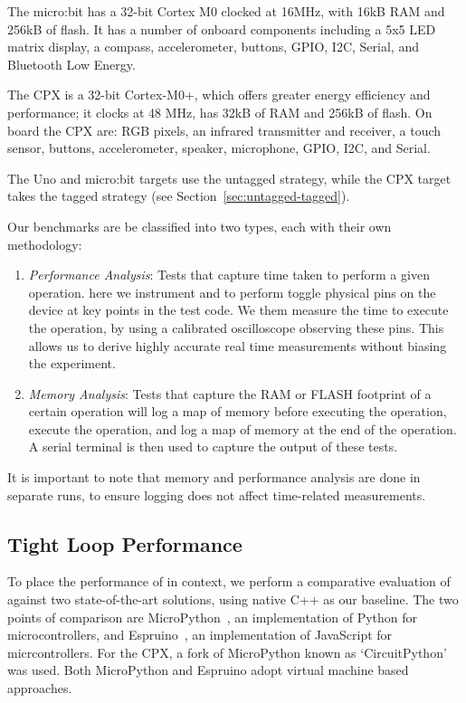 The micro:bit has a 32-bit Cortex M0 clocked at 16MHz, with 16kB RAM and 256kB of flash. It has a number of onboard components
including a 5x5 LED matrix display, a compass, accelerometer, buttons, GPIO, I2C, Serial, and Bluetooth Low Energy.

The CPX is a 32-bit Cortex-M0+, which offers greater energy efficiency and performance; it clocks at 48 MHz, has 32kB of RAM and
256kB of flash. On board the CPX are: RGB pixels, an infrared transmitter and receiver, a touch sensor, buttons, accelerometer, speaker,
microphone, GPIO, I2C, and Serial.

The Uno and micro:bit \MC targets use the untagged strategy, while the CPX target takes the tagged strategy (see Section~\ref{sec:untagged-tagged}).

Our benchmarks are be classified into two types, each with their own methodology:

\begin{enumerate}
    \item \textit{Performance Analysis}: Tests that capture time taken to perform a given operation. here we instrument
    \MC and \CO to perform toggle physical pins on the device at key points in the test code. We them measure the time to
   execute the operation, by using a calibrated oscilloscope observing these pins. This allows us to derive highly accurate real time
   measurements without biasing the experiment.

    \item \textit{Memory Analysis}: Tests that capture the RAM or FLASH footprint of a certain operation will log a map of memory
    before executing the operation, execute the operation, and log a map of memory at the end of the operation.
    A serial terminal is then used to capture the output of these tests.
\end{enumerate}

It is important to note that memory and performance analysis are done in separate runs,
to ensure logging does not affect time-related measurements.

\subsection{Tight Loop Performance}

To place the performance of \MC in context, we perform a comparative evaluation of \MC against two state-of-the-art
solutions, using native C++ as our baseline. The two points of comparison are MicroPython~\cite{MicroPython}, an implementation
of Python for microcontrollers, and Espruino~\cite{espruinoBook}, an implementation of JavaScript for micrcontrollers.
For the CPX, a fork of MicroPython known as `CircuitPython' was used. Both MicroPython and Espruino adopt virtual machine based
approaches.

